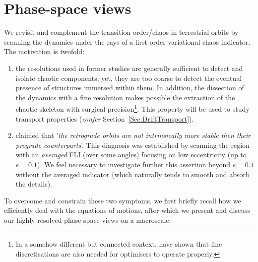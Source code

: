\documentclass{amsart}
\theoremstyle{definition}
\theoremstyle{remark}
\numberwithin{equation}{section}
\begin{document}
\section{Phase-space views}\label{sec:FLIsurvey}
We revisit and complement the transition order/chaos in terrestrial orbits by scanning the dynamics under the rays {\color{black} of a first order variational chaos indicator}.  The motivation is twofold: 
\begin{enumerate}
	\item the resolutions used in former studies are generally sufficient to detect and isolate chaotic components; yet, they are too coarse to detect the eventual presence of structures immersed within them. In addition, the dissection of the dynamics with a fine resolution makes possible the extraction of the chaotic skeleton with  surgical precision\footnote{In a somehow different but connected context, \cite{rAr18} have shown that fine discretisations are also needed for optimisers to operate properly.}. This property {\color{black} will be used} to study  transport 
properties (\textit{confer} Section~\ref{Sec:DriftTransport}).
	\item \cite{iGk16} claimed that '\textit{the retrograde orbits are not intrinsically more stable then their prograde counterparts}'. This 
diagnosis was established by scanning the region with an \textit{averaged} FLI (over some angles) focusing on low eccentricity (up to $e=0.1$). We feel necessary to investigate further this {\color{black} assertion} beyond $e=0.1$ without the {\color{black}averaged} indicator {\color{black}(}{\color{black}which} naturally tends to smooth and absorb the details{\color{black})}. 
\end{enumerate}	 
To overcome and constrain these two symptoms, 
we first briefly recall how we efficiently deal with the equations of motions,  {\color{black}after which}  we  present and discuss  our highly-resolved phase-space views on a macroscale. 

\end{document}
